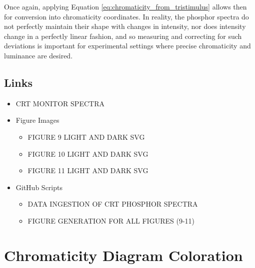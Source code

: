 \documentclass{article}
\begin{document}
\begin{multicols}{2}
Once again, applying Equation \ref{eq:chromaticity_from_tristimulus} allows then for conversion into chromaticity coordinates.  In reality, the phosphor spectra do not perfectly maintain their shape with changes in intensity, nor does intensity change in a perfectly linear fashion, and so measuring and correcting for such deviations is important for experimental settings where precise chromaticity and luminance are desired.

\subsection{Links} %

\begin{itemize}
    \item CRT MONITOR SPECTRA
    \item Figure Images
    \begin{itemize}
        \item FIGURE 9 LIGHT AND DARK SVG
        \item FIGURE 10 LIGHT AND DARK SVG
        \item FIGURE 11 LIGHT AND DARK SVG
    \end{itemize}
    \item GitHub Scripts
    \begin{itemize}
        \item DATA INGESTION OF CRT PHOSPHOR SPECTRA
        \item FIGURE GENERATION FOR ALL FIGURES (9-11)
    \end{itemize}
\end{itemize}

\end{multicols}


\section{Chromaticity Diagram Coloration} \label{sec:chromaticity_coloration}
\end{document}
